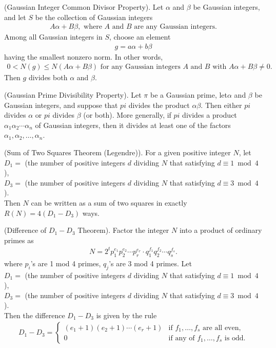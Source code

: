 \documentclass[graybox]{svmult}
\begin{document}
\begin{theorem}
(Gaussian Integer Common Divisor Property). Let $\alpha$ and $\beta$ be Gaussian integers, and let $S$ be the collection of Gaussian integers
\begin{align*}
A\alpha +B\beta, \text{ where $A$ and $B$ are any Gaussian integers.}
\end{align*}
Among all Gaussian integers in $S$, choose an element
\begin{align*}
g = a\alpha + b\beta
\end{align*}
having the smallest nonzero norm. In other words,
\begin{align*}
0 < N(g) \leqslant N(A\alpha+B\beta) \text{ for any Gaussian integers $A$ and $B$ with $A\alpha+B\beta \not = 0$}.
\end{align*}
Then $g$ divides both $\alpha$ and $\beta$.
\end{theorem}

\begin{theorem}
(Gaussian Prime Divisibility Property). Let $\pi$ be a Gaussian prime, let$\alpha$ and $\beta$ be Gaussian integers, and suppose that $pi$ divides the product $\alpha\beta$. Then either $pi$ divides $\alpha$ or $pi$ divides $\beta$ (or both).
More generally, if $pi$ divides a product $\alpha_1\alpha_2\cdots\alpha_n$ of Gaussian integers, then it divides at least one of the factors $\alpha_1, \alpha_2, \ldots, \alpha_n$.
\end{theorem}

\begin{theorem}
(Sum of Two Squares Theorem (Legendre)). For a given positive integer $N$, let\\
$D_1 =$ (the number of positive integers $d$ dividing $N$ that satisfying $d\equiv 1\bmod 4$),\\
$D_3 =$ (the number of positive integers $d$ dividing $N$ that satisfying $d\equiv 3\bmod 4$).\\
Then $N$ can be written as a sum of two squares in exactly $R(N)=4(D_1-D_3)$ ways.
\end{theorem}

\begin{theorem}
(Difference of $D_1-D_3$ Theorem). Factor the integer $N$ into a product of ordinary primes as
\begin{align*}
N = 2^t p_1^{e_1}p_2^{e_2}\cdots p_r^{e_r} \cdot q_1^{f_1}q_2^{f_2}\cdots q_s^{f_s}.
\end{align*}
where $p_i$'s are 1 mod 4 primes, $q_j$'s are 3 mod 4 primes.
Let \\
$D_1 =$ (the number of positive integers $d$ dividing $N$ that satisfying $d\equiv 1\bmod 4$),\\
$D_3 =$ (the number of positive integers $d$ dividing $N$ that satisfying $d\equiv 3\bmod 4$).\\
Then the difference $D_1-D_3$ is given by the rule
\begin{align*}
D_1-D_3= \begin{cases} (e_1+1)(e_2+1) \cdots (e_r+1) &\mbox{if $f_1, \ldots, f_s$ are all even,} \\
0 & \mbox{if any of $f_1, \ldots, f_s$ is odd.} \end{cases}
\end{align*}
\end{theorem}
\end{document}
